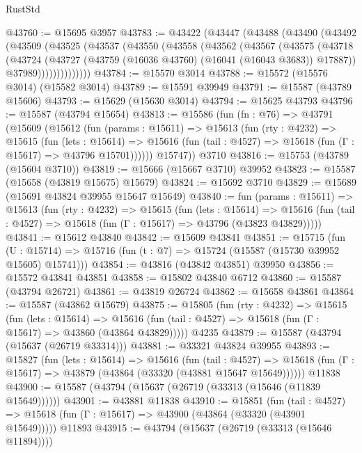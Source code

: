\begin{lexlean}{RustStd}
\begin{coremodule}
@43760 := @15695 @3957
@43783 := @43422
    (@43447
      (@43488
        (@43490
          (@43492
            (@43509
              (@43525
                (@43537
                  (@43550
                    (@43558
                      (@43562
                        (@43567
                          (@43575
                            (@43718
                              (@43724
                                (@43727 (@43759 (@16036 @43760) (@16041 (@16043 @3683)) @17887))
                                @37989))))))))))))))
@43784 := @15570 @3014
@43788 := @15572 (@15576 @3014) (@15582 @3014)
@43789 := @15591 @39949
@43791 := @15587 (@43789 @15606)
@43793 := @15629 (@15630 @3014)
@43794 := @15625 @43793
@43796 := @15587 (@43794 @15654)
@43813 := @15586
    (fun (fn : @76) =>
    @43791
      (@15609
        (@15612
          (fun (params : @15611) =>
          @15613
            (fun (rty : @4232) =>
            @15615
              (fun (lets : @15614) =>
              @15616 (fun (tail : @4527) => @15618 (fun (Γ : @15617) => @43796 @15701))))))
        @15747))
    @3710
@43816 := @15753 (@43789 (@15604 @3710))
@43819 := @15666 (@15667 @3710) @39952
@43823 := @15587 (@15658 (@43819 @15675) @15679)
@43824 := @15692 @3710
@43829 := @15689 (@15691 @43824 @39955 @15647 @15649)
@43840 := fun (params : @15611) =>
  @15613
    (fun (rty : @4232) =>
    @15615
      (fun (lets : @15614) =>
      @15616 (fun (tail : @4527) => @15618 (fun (Γ : @15617) => @43796 (@43823 @43829)))))
@43841 := @15612 @43840
@43842 := @15609 @43841
@43851 := @15715
    (fun (U : @15714) => @15716 (fun (t : @7) => @15724 (@15587 (@15730 @39952 @15605) @15741)))
@43854 := @43816 (@43842 @43851) @39950
@43856 := @15572 @43841 @43851
@43858 := @15802 @43840 @6712
@43860 := @15587 (@43794 @26721)
@43861 := @43819 @26724
@43862 := @15658 @43861
@43864 := @15587 (@43862 @15679)
@43875 := @15805
    (fun (rty : @4232) =>
    @15615
      (fun (lets : @15614) =>
      @15616 (fun (tail : @4527) => @15618 (fun (Γ : @15617) => @43860 (@43864 @43829)))))
    @4235
@43879 := @15587 (@43794 (@15637 (@26719 @33314)))
@43881 := @33321 @43824 @39955
@43893 := @15827
    (fun (lets : @15614) =>
    @15616
      (fun (tail : @4527) =>
      @15618 (fun (Γ : @15617) => @43879 (@43864 (@33320 (@43881 @15647 @15649))))))
    @11838
@43900 := @15587 (@43794 (@15637 (@26719 (@33313 (@15646 (@11839 @15649))))))
@43901 := @43881 @11838
@43910 := @15851
    (fun (tail : @4527) => @15618 (fun (Γ : @15617) => @43900 (@43864 (@33320 (@43901 @15649)))))
    @11893
@43915 := @43794 (@15637 (@26719 (@33313 (@15646 @11894))))

\end{coremodule}
\end{lexlean}
